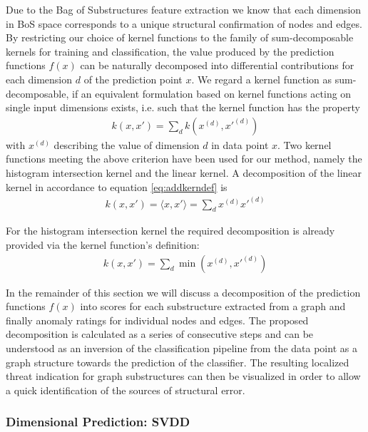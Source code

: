 \documentclass{llncs}
\begin{document}
Due to the Bag of Substructures feature extraction we know that each dimension in BoS space corresponds to a unique structural confirmation of nodes and edges. By restricting our choice of kernel functions to the family of sum-decomposable kernels for training and classification, the value produced by the prediction functions $f(x)$ can be naturally decomposed into differential contributions for each dimension $d$ of the prediction point $x$.
We regard a kernel function as sum-decomposable, if an equivalent formulation based on kernel functions acting on single input dimensions exists, i.e. such that the kernel function has the property
\begin{align}
k(x,x') = \sum\limits_d k(x^{(d)},x'^{(d)})
\label{eq:addkerndef}
\end{align}
with $x^{(d)}$ describing the value of dimension $d$ in data point $x$.
Two kernel functions meeting the above criterion have been used for our method, namely the histogram intersection kernel and the linear kernel. A decomposition of the linear kernel in accordance to equation \eqref{eq:addkerndef} is
\begin{align}
k(x, x') = \langle x , x' \rangle = \sum\limits_d x^{(d)}x'^{(d)}
\end{align}

For the histogram intersection kernel the required decomposition is already provided via the kernel function's definition:
\begin{align}
k(x, x') = \sum\limits_d \min(x^{(d)},x'^{(d)})
\end{align}

In the remainder of this section we will discuss a decomposition of the prediction functions $f(x)$ into scores for each substructure extracted from a graph and finally anomaly ratings for individual nodes and edges. The proposed decomposition is calculated as a series of consecutive steps and can be understood as an inversion of the classification pipeline from the data point as a graph structure towards the prediction of the classifier. The resulting localized threat indication for graph substructures can then be visualized in order to allow a quick identification of the sources of structural error. 



\subsubsection{Dimensional Prediction: SVDD}
\end{document}
